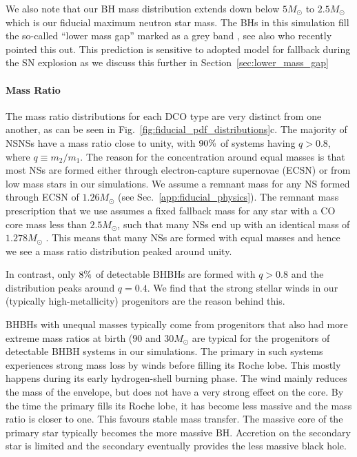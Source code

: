 We also note that our BH mass distribution extends down below $5\unit{M_{\odot}}$ to $2.5 \unit{M_{\odot}}$ which is our fiducial maximum neutron star mass. The BHs in this simulation fill the so-called ``lower mass gap'' marked as a grey band \citep{Ozel+2010,Farr+2011}, see also \citet{Shao+2021} who recently pointed this out. This prediction is sensitive to adopted model for fallback during the SN explosion as we discuss this further in Section~\ref{sec:lower_mass_gap}

\paragraph{Mass Ratio} The mass ratio distributions for each DCO type are very distinct from one another, as can be seen in Fig.~\ref{fig:fiducial_pdf_distributions}c. The majority of NSNSs have a mass ratio close to unity, with $90\%{}$ of systems having $q > 0.8$, where $q \equiv m_2 / m_1$. The reason for the concentration around equal masses is that most NSs are formed either through electron-capture supernovae (ECSN) or from low mass stars in our simulations. We assume a remnant mass for any NS formed through ECSN of $1.26 \unit{M_{\odot}}$ (see Sec.~\ref{app:fiducial_physics}). The remnant mass prescription that we use assumes a fixed fallback mass for any star with a CO core mass less than $2.5 \unit{M_\odot}$, such that many NSs end up with an identical mass of $1.278 \unit{M_\odot}$ \citep[see][Eq.~19]{Fryer+2012}. This means that many NSs are formed with equal masses and hence we see a mass ratio distribution peaked around unity.

In contrast, only $8\%{}$ of detectable BHBHs are formed with $q > 0.8$ and the distribution peaks around $q = 0.4$. We find that the strong stellar winds in our (typically high-metallicity) progenitors are the reason behind this. 

BHBHs with unequal masses typically come from progenitors that also had more extreme mass ratios at birth ($90$ and $30\unit{M_{\odot}}$ are typical for the progenitors of detectable BHBH systems in our simulations. The primary in such systems experiences strong mass loss by winds before filling its Roche lobe. This mostly happens during its early hydrogen-shell burning phase. The wind mainly reduces the mass of the envelope, but does not have a very strong effect on the core. By the time the primary fills its Roche lobe, it has become less massive and the mass ratio is closer to one. This favours stable mass transfer. The massive core of the primary star typically becomes the more massive BH. Accretion on the secondary star is limited and the secondary eventually provides the less massive black hole.

